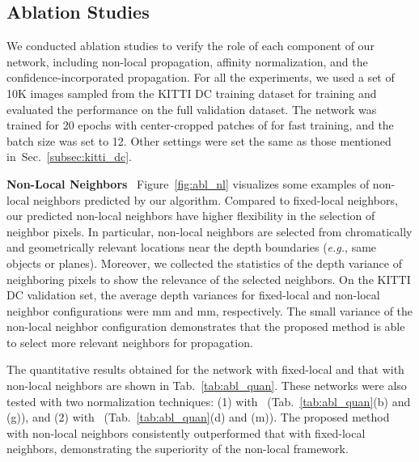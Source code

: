 \documentclass[runningheads]{llncs}
\newcommand{\tabref}[1]{Tab.~\ref{#1}}
\newcommand{\secref}[1]{Sec.~\ref{#1}}
\newcommand{\Figref}[1]{Figure~\ref{#1}}
\newcommand{\eg}{\textit{e.g.}}
\newcommand{\absSum}{}
\newcommand{\tgAbsSumStar}{}
\begin{document}
\subsection{Ablation Studies}
\label{subsec:ablation}
We conducted ablation studies to verify the role of each component of our network, including non-local propagation, affinity normalization, and the confidence-incorporated propagation.
For all the experiments, we used a set of 10K images sampled from the KITTI DC training dataset for training and evaluated the performance on the full validation dataset. 
The network was trained for 20 epochs with center-cropped patches of  for fast training, and the batch size was set to 12. 
Other settings were set the same as those mentioned in~\secref{subsec:kitti_dc}.



\noindent \textbf{Non-Local Neighbors} \ 
\Figref{fig:abl_nl} visualizes some examples of non-local neighbors predicted by our algorithm. 
Compared to fixed-local neighbors, our predicted non-local neighbors have higher flexibility in the selection of neighbor pixels. 
In particular, non-local neighbors are selected from chromatically and geometrically relevant locations near the depth boundaries (\eg, same objects or planes). 
Moreover, we collected the statistics of the depth variance of neighboring pixels to show the relevance of the selected neighbors. 
On the KITTI DC validation set, the average depth variances for fixed-local and non-local neighbor configurations were mm and mm, respectively. 
The small variance of the non-local neighbor configuration demonstrates that the proposed method is able to select more relevant neighbors for propagation. 

The quantitative results obtained for the network with fixed-local  and that with non-local neighbors  are shown in \tabref{tab:abl_quan}. 
These networks were also tested with two normalization techniques: (1) with \absSum~(\tabref{tab:abl_quan}(b) and (g)), and (2) with \tgAbsSumStar~(\tabref{tab:abl_quan}(d) and (m)). 
The proposed method with non-local neighbors consistently outperformed that with fixed-local neighbors, demonstrating the superiority of the non-local framework.
\end{document}
